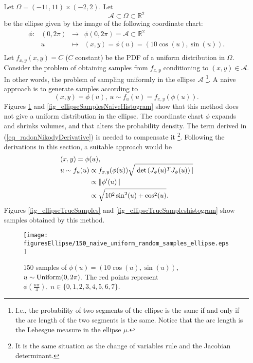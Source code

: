 \begin{example}
Let $\Omega = (-11,11)\times (-2,2)$.
Let $$\mathcal{A}\subset \Omega \subset \mathbb{R}^2$$
be the ellipse given by the image of the following coordinate chart:
$$
  \begin{array}{crcl}
    \phi: & (0,2\pi) & \to     & \phi(0,2\pi) = \mathcal{A} \subset \mathbb{R}^2 \\
          & u        & \mapsto & (x,y) = \phi(u) = (10\cos(u),\sin(u)). \\
  \end{array}
$$
Let $f_{x,y}(x,y) = C$ ($C$ constant) be the PDF of a uniform distribution in $\Omega$. 
Consider the problem of obtaining samples from $f_{x,y}$ conditioning to $(x,y) \in \mathcal{A}$. In other words, the problem of sampling uniformly in the ellipse $\mathcal{A}$
\footnote{I.e., the probability of two segments of the ellipse is the same if and only if the arc length of the two segments is the same. Notice that the arc length is the Lebesgue measure in the ellipse $\mu$.}.
A naive approach is to generate samples according to
$$
  (x,y) = \phi(u), \ u\sim f_u(u) = f_{x,y}(\phi(u)).
$$
Figures \ref{fig_ellipseSamplesNaive} and \ref{fig_ellipseSamplesNaiveHistogram} show that this method does not give a uniform distribution in the ellipse.
The coordinate chart $\phi$ expands and shrinks volumes, and that alters the probability density.
The term derived in (\ref{eq_radonNikodyDerivative}) is needed to compensate it
\footnote{It is the same situation as the change of variables rule and the Jacobian determinant.}.
Following the derivations in this section, a suitable approach would be
$$
 \begin{array}{l}
  (x,y) = \phi(u), \\
 \begin{aligned}
  u\sim f_u(u) &\propto f_{x,y}(\phi(u))\sqrt{|\textup{det}\left(J_{\phi}(u)^TJ_{\phi}(u)\right)|} \\
  &\propto \|\phi'(u)\| \\
  &\propto \sqrt{10^2\sin^2(u)+\cos^2(u)}.\\
 \end{aligned}
 \end{array}
$$
Figures \ref{fig_ellipseTrueSamples} and \ref{fig_ellipseTrueSampleshistogram} show samples obtained by this method.
\end{example}

\begin{figure}[!htbp]
  \centering
    \texttt{[image: figuresEllipse/150\_naive\_uniform\_random\_samples\_ellipse.eps]} 
  \caption[Random samples on an ellipse - Naive method]
{
  $150$ samples of $\phi(u) = (10\cos(u),\sin(u))$, 
  $u \sim \textup{Uniform}(0,2\pi)$. The red points represent
  $\phi(\frac{n\pi}{4}), \ n \in \{ 0,1,2,3,4,5,6,7 \}$.
}
\label{fig_ellipseSamplesNaive}
\end{figure}

